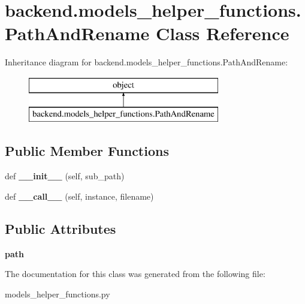 \hypertarget{classbackend_1_1models__helper__functions_1_1_path_and_rename}{}\section{backend.\+models\+\_\+helper\+\_\+functions.\+Path\+And\+Rename Class Reference}
\label{classbackend_1_1models__helper__functions_1_1_path_and_rename}
Inheritance diagram for backend.\+models\+\_\+helper\+\_\+functions.\+Path\+And\+Rename\+:\begin{figure}[H]
\begin{center}
\leavevmode
\includegraphics[height=2.000000cm]{classbackend_1_1models__helper__functions_1_1_path_and_rename}
\end{center}
\end{figure}
\subsection*{Public Member Functions}
\begin{DoxyCompactItemize}
\item 
\mbox{\label{classbackend_1_1models__helper__functions_1_1_path_and_rename_aded3c71835bd5d6a1fe6d55adf4491fe}} 
def {\bfseries \+\_\+\+\_\+init\+\_\+\+\_\+} (self, sub\+\_\+path)
\item 
\mbox{\label{classbackend_1_1models__helper__functions_1_1_path_and_rename_a7f6788b9fb77beb7a91c6b180214f8a1}} 
def {\bfseries \+\_\+\+\_\+call\+\_\+\+\_\+} (self, instance, filename)
\end{DoxyCompactItemize}
\subsection*{Public Attributes}
\begin{DoxyCompactItemize}
\item 
\mbox{\label{classbackend_1_1models__helper__functions_1_1_path_and_rename_aff2db7313bc72e1038fd13187c057883}} 
{\bfseries path}
\end{DoxyCompactItemize}


The documentation for this class was generated from the following file\+:\begin{DoxyCompactItemize}
\item 
models\+\_\+helper\+\_\+functions.\+py\end{DoxyCompactItemize}
